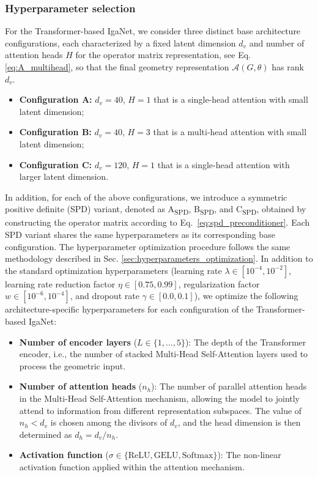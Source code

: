 \documentclass{article}
\newcommand{\Dlat}{d_v} %
\theoremstyle{plain}
\numberwithin{equation}{section}
\begin{document}
\subsubsection{Hyperparameter selection}
For the Transformer-based IgaNet, we consider three distinct base architecture configurations, each characterized by a fixed latent dimension $\Dlat$ and number of attention heads $H$ for the operator matrix representation, see Eq. \eqref{eq:A_multihead}, so that the final geometry representation $\mathcal{A}(G, \theta)$ has rank $\Dlat$.
\begin{itemize}
    \item \textbf{Configuration A:} $\Dlat = 40$, $H = 1$ that is a single-head attention with small latent dimension;
    \item \textbf{Configuration B:} $\Dlat = 40$, $H = 3$ that is a multi-head attention with small latent dimension;
    \item \textbf{Configuration C:} $\Dlat = 120$, $H = 1$ that is a single-head attention with larger latent dimension.
\end{itemize}
In addition, for each of the above configurations, we introduce a symmetric positive definite (SPD) variant, denoted as A\textsubscript{SPD}, B\textsubscript{SPD}, and C\textsubscript{SPD}, obtained by constructing the operator matrix according to Eq.~\eqref{eq:spd_preconditioner}. Each SPD variant shares the same hyperparameters as its corresponding base configuration.
The hyperparameter optimization procedure follows the same methodology described in Sec. \ref{sec:hyperparameters_optimization}. In addition to the standard optimization hyperparameters (learning rate $\lambda \in [10^{-4}, 10^{-2}]$, learning rate reduction factor $\eta \in [0.75, 0.99]$, regularization factor $w \in [10^{-6}, 10^{-4}]$, and dropout rate $\gamma \in [0.0, 0.1]$), we optimize the following architecture-specific hyperparameters for each configuration of the Transformer-based IgaNet:
\begin{itemize}
    \item \textbf{Number of encoder layers} ($L \in \{1, \ldots, 5\}$): The depth of the Transformer encoder, i.e., the number of stacked Multi-Head Self-Attention layers used to process the geometric input.

    \item \textbf{Number of attention heads} ($n_h$): The number of parallel attention heads in the Multi-Head Self-Attention mechanism, allowing the model to jointly attend to information from different representation subspaces. The value of $n_h<\Dlat$ is chosen among the divisors of $\Dlat$, and the head dimension is then determined as $d_h = \Dlat / n_h$.

    \item \textbf{Activation function} ($\sigma \in \{\text{ReLU}, \text{GELU}, \text{Softmax}\}$): The non-linear activation function applied within the attention mechanism.
\end{itemize}
\end{document}
